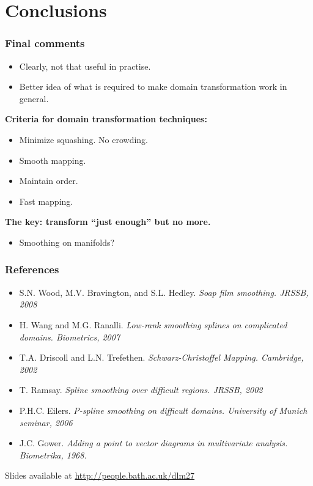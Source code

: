 \documentclass[ignorenonframetext]{beamer} %
\newcommand{\bc}{\begin{center}}
\newcommand{\ec}{\end{center}}
\newcommand{\bi}{\begin{itemize}}
\newcommand{\ei}{\end{itemize}}
\begin{document}









\section{Conclusions}

\begin{frame}
	\frametitle{Final comments}
		\bi
			\item Clearly, not that useful in practise.
			\item Better idea of what is required to make domain transformation work in general.
		\ei
		\textbf{Criteria for domain transformation techniques:}
          \bi
            \item Minimize squashing. No crowding.
            \item Smooth mapping.
            \item Maintain order.
            \item Fast mapping.
           \ei
         \bc \textbf{The key: transform ``just enough'' but no more.} \ec
         \bi
         		\item Smoothing on manifolds?
        \ei
\end{frame}

\begin{frame}
	\frametitle{References}
       \bi
         \item S.N. Wood, M.V. Bravington, and S.L. Hedley. \emph{Soap film smoothing. JRSSB, 2008}
         \item H. Wang and M.G. Ranalli. \emph{Low-rank smoothing splines on complicated domains. Biometrics, 2007}
         \item T.A. Driscoll and L.N. Trefethen. \emph{Schwarz-Christoffel Mapping. Cambridge, 2002}
         \item T. Ramsay. \emph{Spline smoothing over difficult regions. JRSSB, 2002}
         \item P.H.C. Eilers. \emph{P-spline smoothing on difficult domains. University of Munich seminar, 2006}
	\item J.C. Gower. \emph{Adding a point to vector diagrams in multivariate analysis. Biometrika, 1968.}
        \ei
        Slides available at \url{http://people.bath.ac.uk/dlm27}
\end{frame}
\end{document}
